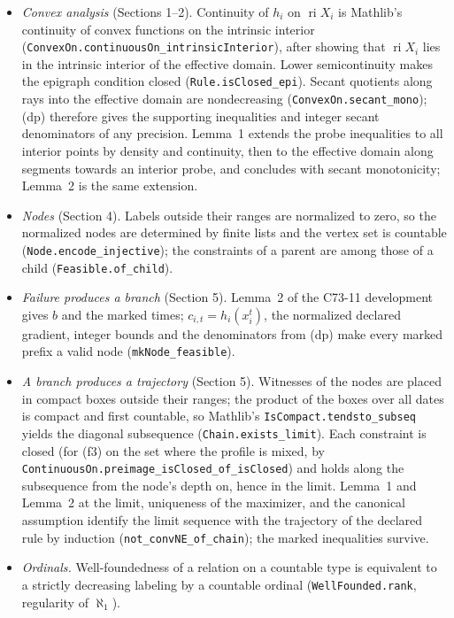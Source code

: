 \documentclass[11pt]{article}
\theoremstyle{definition}
\DeclareMathOperator{\ri}{ri}
\begin{document}
\begin{itemize}
\item \emph{Convex analysis} (Sections 1--2). Continuity of $h_i$ on $\ri X_i$ is Mathlib's continuity of convex functions on the intrinsic interior (\texttt{ConvexOn.continuousOn\_intrinsicInterior}), after showing that $\ri X_i$ lies in the intrinsic interior of the effective domain. Lower semicontinuity makes the epigraph condition closed (\texttt{Rule.isClosed\_epi}). Secant quotients along rays into the effective domain are nondecreasing (\texttt{ConvexOn.secant\_mono}); (dp) therefore gives the supporting inequalities and integer secant denominators of any precision. Lemma~1 extends the probe inequalities to all interior points by density and continuity, then to the effective domain along segments towards an interior probe, and concludes with secant monotonicity; Lemma~2 is the same extension.
\item \emph{Nodes} (Section 4). Labels outside their ranges are normalized to zero, so the normalized nodes are determined by finite lists and the vertex set is countable (\texttt{Node.encode\_injective}); the constraints of a parent are among those of a child (\texttt{Feasible.of\_child}).
\item \emph{Failure produces a branch} (Section 5). Lemma~2 of the C73-11 development gives $b$ and the marked times; $c_{i,t}=h_i(x^t_i)$, the normalized declared gradient, integer bounds and the denominators from (dp) make every marked prefix a valid node (\texttt{mkNode\_feasible}).
\item \emph{A branch produces a trajectory} (Section 5). Witnesses of the nodes are placed in compact boxes outside their ranges; the product of the boxes over all dates is compact and first countable, so Mathlib's \texttt{IsCompact.tendsto\_subseq} yields the diagonal subsequence (\texttt{Chain.exists\_limit}). Each constraint is closed (for (f3) on the set where the profile is mixed, by \texttt{ContinuousOn.preimage\_isClosed\_of\_isClosed}) and holds along the subsequence from the node's depth on, hence in the limit. Lemma~1 and Lemma~2 at the limit, uniqueness of the maximizer, and the canonical assumption identify the limit sequence with the trajectory of the declared rule by induction (\texttt{not\_convNE\_of\_chain}); the marked inequalities survive.
\item \emph{Ordinals.} Well-foundedness of a relation on a countable type is equivalent to a strictly decreasing labeling by a countable ordinal (\texttt{WellFounded.rank}, regularity of $\aleph_1$).
\end{itemize}
\end{document}
